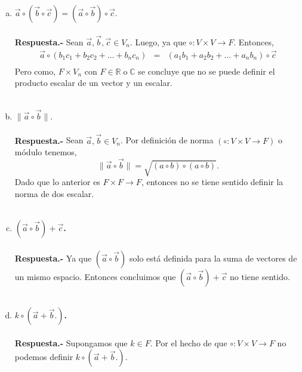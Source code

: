 \begin{enumerate}
\begin{enumerate}[a)]
	\item \textbf{\boldmath $\vec{a}\circ \left(\vec{b}\circ \vec{c}\right)=\left(\vec{a}\circ \vec{b}\right)\circ \vec{c}.$\\\\
	    Respuesta.-}\; Sean $\vec{a},\vec{b},\vec{c}\in V_n$. Luego, ya que $\circ:V\times V \to F$. Entonces,
	    $$\begin{array}{rcl}
		\vec{a}\circ \left(b_1c_1+b_2c_2+\ldots + b_nc_n\right)&=&\left(a_1b_1+a_2b_2+\ldots + a_nb_n\right)\circ \vec{c}\\
	    \end{array}$$
	    Pero como, $F \times V_n$ con $F\in \mathbb{R}\; \mbox{o}\; \mathbb{C}$ se concluye que no se puede definir el producto escalar de un vector y un escalar.\\\\


	\item \textbf{\boldmath $\|\vec{a}\circ\vec{b}\|.$\\\\
	    Respuesta.-}\; Sean $\vec{a},\vec{b}\in V_n$. Por definición de norma $(\circ : V\times V \to F)$ o módulo tenemos,
	    $$\|\vec{a}\circ \vec{b}\| = \sqrt{(a\circ b)\circ (a\circ b)}.$$
	    Dado que lo anterior es $F\times F \to F$, entonces no se tiene sentido definir la norma de dos escalar.\\\\
	    

	\item \textbf{\boldmath $(\vec{a}\circ \vec{b})+\vec{c}$.\\\\
	    Respuesta.-}\; Ya que $(\vec{a}\circ \vec{b})$ solo está definida para la suma de vectores de un mismo espacio. Entonces concluimos que $(\vec{a}\circ \vec{b})+\vec{c}$ no tiene sentido.\\\\

	\item \textbf{\boldmath $k\circ \left(\vec{a}+\vec{b}.\right)$.\\\\
	    Respuesta.-}\; Supongamos que $k\in F$. Por el hecho de que $\circ : V\times V \to F$ no podemos definir $k\circ \left(\vec{a}+\vec{b}.\right)$.\\\\

    \end{enumerate}


\end{enumerate}
